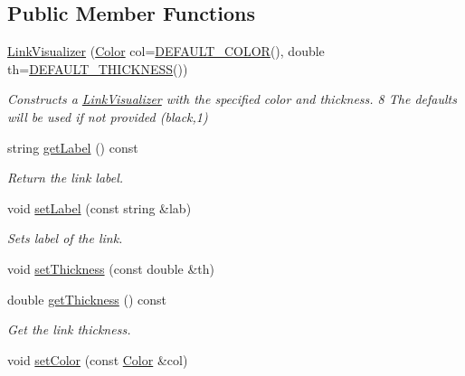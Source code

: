 \subsection*{Public Member Functions}
\begin{DoxyCompactItemize}
\item 
\hyperlink{classbridges_1_1datastructure_1_1_link_visualizer_ae910a1d6f13a3807b025c2c94231d7c8}{Link\+Visualizer} (\hyperlink{classbridges_1_1datastructure_1_1_color}{Color} col=\hyperlink{classbridges_1_1datastructure_1_1_link_visualizer_aa42e1a41ab0332c2e50e1a21068b2533}{D\+E\+F\+A\+U\+L\+T\+\_\+\+C\+O\+L\+OR}(), double th=\hyperlink{classbridges_1_1datastructure_1_1_link_visualizer_a3b23cb9f5ab2dd564fcc4d974e3753f8}{D\+E\+F\+A\+U\+L\+T\+\_\+\+T\+H\+I\+C\+K\+N\+E\+SS}())
\begin{DoxyCompactList}\small\item\em Constructs a \hyperlink{classbridges_1_1datastructure_1_1_link_visualizer}{Link\+Visualizer} with the specified color and thickness. 8 The defaults will be used if not provided (black,1) \end{DoxyCompactList}\item 
string \hyperlink{classbridges_1_1datastructure_1_1_link_visualizer_ae25654272ef1613555c7257e5f184462}{get\+Label} () const
\begin{DoxyCompactList}\small\item\em Return the link label. \end{DoxyCompactList}\item 
void \hyperlink{classbridges_1_1datastructure_1_1_link_visualizer_a20ed50bf0e02f79dda0cb54c3af722fe}{set\+Label} (const string \&lab)
\begin{DoxyCompactList}\small\item\em Sets label of the link. \end{DoxyCompactList}\item 
void \hyperlink{classbridges_1_1datastructure_1_1_link_visualizer_acac8af8117ea32ccc1c3bf9843db9881}{set\+Thickness} (const double \&th)
\item 
double \hyperlink{classbridges_1_1datastructure_1_1_link_visualizer_ab8141d3139ea486fceef41df8d61291d}{get\+Thickness} () const
\begin{DoxyCompactList}\small\item\em Get the link thickness. \end{DoxyCompactList}\item 
void \hyperlink{classbridges_1_1datastructure_1_1_link_visualizer_aef9811c2aae77e86f601654a17ce2f87}{set\+Color} (const \hyperlink{classbridges_1_1datastructure_1_1_color}{Color} \&col)

\end{DoxyCompactItemize}

